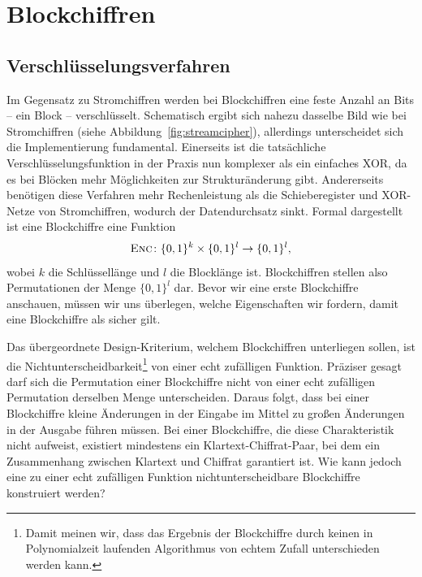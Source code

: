 \section{Blockchiffren}
\label{sec:blockchiffren}
\subsection{Verschlüsselungsverfahren}
Im Gegensatz zu Stromchiffren werden bei Blockchiffren  eine feste Anzahl an Bits -- ein Block -- verschlüsselt. Schematisch ergibt sich nahezu dasselbe Bild wie bei Stromchiffren (siehe Abbildung~\ref{fig:streamcipher}), allerdings unterscheidet sich die Implementierung fundamental. Einerseits ist die tatsächliche Verschlüsselungsfunktion in der Praxis nun komplexer als ein einfaches XOR, da es bei Blöcken mehr Möglichkeiten zur Strukturänderung gibt. Andererseits benötigen diese Verfahren mehr Rechenleistung als die Schieberegister und XOR-Netze von Stromchiffren, wodurch der Datendurchsatz sinkt.
Formal dargestellt ist eine Blockchiffre eine Funktion
\begin{align*}
	\textsc{Enc} \colon \{0, 1\}^k \times \{0, 1\}^l \rightarrow \{0, 1\}^l\text{,}
\end{align*}
wobei \(k\) die Schlüssellänge und \(l\) die Blocklänge ist. Blockchiffren stellen also Permutationen der Menge 
\(\{0, 1\}^l\) dar.
Bevor wir eine erste Blockchiffre anschauen, müssen wir uns überlegen, welche Eigenschaften wir fordern, damit eine Blockchiffre als sicher gilt.

Das übergeordnete Design-Kriterium, welchem Blockchiffren unterliegen sollen, ist die Nichtunterscheidbarkeit\footnote{Damit meinen wir, dass das Ergebnis der Blockchiffre durch keinen in Polynomialzeit laufenden Algorithmus von echtem Zufall unterschieden werden kann.} von einer echt zufälligen Funktion. Präziser gesagt darf sich die Permutation einer Blockchiffre nicht von einer echt zufälligen Permutation derselben Menge unterscheiden. Daraus folgt, dass bei einer Blockchiffre kleine Änderungen in der Eingabe im Mittel zu großen Änderungen in der Ausgabe führen müssen. Bei einer Blockchiffre, die diese Charakteristik nicht aufweist, existiert mindestens ein Klartext-Chiffrat-Paar, bei dem ein Zusammenhang zwischen Klartext und Chiffrat garantiert ist. Wie kann jedoch eine zu einer echt zufälligen Funktion nichtunterscheidbare Blockchiffre konstruiert werden?

